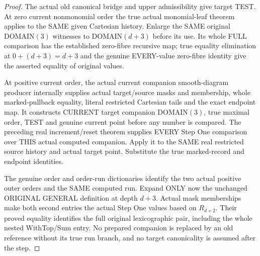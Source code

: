 \begin{proof}
The actual old canonical bridge and upper admissibility give target
TEST. At zero current nonmonomial order the true actual monomial-leaf
theorem applies to the SAME given Cartesian history. Enlarge the SAME
original DOMAIN$(3)$ witnesses to DOMAIN$(d+3)$ before its use. Its
whole FULL comparison has the established zero-fibre recursive map;
true equality elimination at $0+(d+3)=d+3$ and the genuine EVERY-value
zero-fibre identity give the asserted equality of original values.

At positive current order, the actual current companion smooth-diagram
producer internally supplies actual target/source masks and membership,
whole marked-pullback equality, literal restricted Cartesian tails and
the exact endpoint map. It constructs CURRENT target companion
DOMAIN$(3)$, true maximal order, TEST and genuine current point before
any number is compared. The preceding real increment/reset theorem
supplies EVERY Step One comparison over THIS actual computed companion.
Apply it to the SAME real restricted source history and actual target
point. Substitute the true marked-record and endpoint identities.

The genuine order and order-run dictionaries identify the two actual
positive outer orders and the SAME computed run. Expand ONLY now the
unchanged ORIGINAL GENERAL definition at depth $d+3$. Actual mask
memberships make both second entries the actual Step One values based
on $R_{d+2}$. Their proved equality identifies the full original
lexicographic pair, including the whole nested WithTop/Sum entry.
No prepared companion is replaced by an old reference without its true
run branch, and no target canonicality is assumed after the step.
\end{proof}

